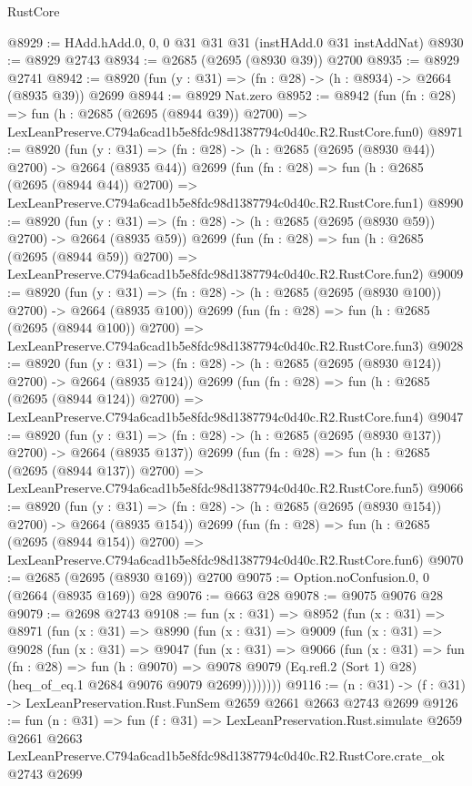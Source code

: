 \begin{lexlean}{RustCore}
\begin{coremodule}
@8929 := HAdd.hAdd.{0, 0, 0} @31 @31 @31 (instHAdd.{0} @31 instAddNat)
@8930 := @8929 @2743
@8934 := @2685 (@2695 (@8930 @39)) @2700
@8935 := @8929 @2741
@8942 := @8920 (fun (y : @31) => (fn : @28) -> (h : @8934) -> @2664 (@8935 @39)) @2699
@8944 := @8929 Nat.zero
@8952 := @8942
    (fun (fn : @28) =>
    fun (h : @2685 (@2695 (@8944 @39)) @2700) =>
    LexLeanPreserve.C794a6cad1b5e8fdc98d1387794c0d40c.R2.RustCore.fun0)
@8971 := @8920
    (fun (y : @31) => (fn : @28) -> (h : @2685 (@2695 (@8930 @44)) @2700) -> @2664 (@8935 @44))
    @2699
    (fun (fn : @28) =>
    fun (h : @2685 (@2695 (@8944 @44)) @2700) =>
    LexLeanPreserve.C794a6cad1b5e8fdc98d1387794c0d40c.R2.RustCore.fun1)
@8990 := @8920
    (fun (y : @31) => (fn : @28) -> (h : @2685 (@2695 (@8930 @59)) @2700) -> @2664 (@8935 @59))
    @2699
    (fun (fn : @28) =>
    fun (h : @2685 (@2695 (@8944 @59)) @2700) =>
    LexLeanPreserve.C794a6cad1b5e8fdc98d1387794c0d40c.R2.RustCore.fun2)
@9009 := @8920
    (fun (y : @31) => (fn : @28) -> (h : @2685 (@2695 (@8930 @100)) @2700) -> @2664 (@8935 @100))
    @2699
    (fun (fn : @28) =>
    fun (h : @2685 (@2695 (@8944 @100)) @2700) =>
    LexLeanPreserve.C794a6cad1b5e8fdc98d1387794c0d40c.R2.RustCore.fun3)
@9028 := @8920
    (fun (y : @31) => (fn : @28) -> (h : @2685 (@2695 (@8930 @124)) @2700) -> @2664 (@8935 @124))
    @2699
    (fun (fn : @28) =>
    fun (h : @2685 (@2695 (@8944 @124)) @2700) =>
    LexLeanPreserve.C794a6cad1b5e8fdc98d1387794c0d40c.R2.RustCore.fun4)
@9047 := @8920
    (fun (y : @31) => (fn : @28) -> (h : @2685 (@2695 (@8930 @137)) @2700) -> @2664 (@8935 @137))
    @2699
    (fun (fn : @28) =>
    fun (h : @2685 (@2695 (@8944 @137)) @2700) =>
    LexLeanPreserve.C794a6cad1b5e8fdc98d1387794c0d40c.R2.RustCore.fun5)
@9066 := @8920
    (fun (y : @31) => (fn : @28) -> (h : @2685 (@2695 (@8930 @154)) @2700) -> @2664 (@8935 @154))
    @2699
    (fun (fn : @28) =>
    fun (h : @2685 (@2695 (@8944 @154)) @2700) =>
    LexLeanPreserve.C794a6cad1b5e8fdc98d1387794c0d40c.R2.RustCore.fun6)
@9070 := @2685 (@2695 (@8930 @169)) @2700
@9075 := Option.noConfusion.{0, 0} (@2664 (@8935 @169)) @28
@9076 := @663 @28
@9078 := @9075 @9076 @28
@9079 := @2698 @2743
@9108 := fun (x : @31) =>
  @8952
    (fun (x : @31) =>
    @8971
      (fun (x : @31) =>
      @8990
        (fun (x : @31) =>
        @9009
          (fun (x : @31) =>
          @9028
            (fun (x : @31) =>
            @9047
              (fun (x : @31) =>
              @9066
                (fun (x : @31) =>
                fun (fn : @28) =>
                fun (h : @9070) =>
                @9078
                  @9079
                  (Eq.refl.{2} (Sort 1) @28)
                  (heq_of_eq.{1} @2684 @9076 @9079 @2699))))))))
@9116 := (n : @31) -> (f : @31) -> LexLeanPreservation.Rust.FunSem @2659 @2661 @2663 @2743 @2699
@9126 := fun (n : @31) =>
  fun (f : @31) =>
  LexLeanPreservation.Rust.simulate
    @2659
    @2661
    @2663
    LexLeanPreserve.C794a6cad1b5e8fdc98d1387794c0d40c.R2.RustCore.crate_ok
    @2743
    @2699
\end{coremodule}
\end{lexlean}
